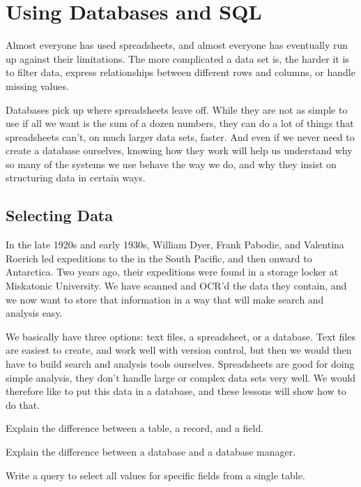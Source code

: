\documentclass{book}
\begin{document}
\chapter{Using Databases and SQL}\label{s:sql}

Almost everyone has used spreadsheets, and almost everyone has
eventually run up against their limitations. The more complicated a data
set is, the harder it is to filter data, express relationships between
different rows and columns, or handle missing values.

Databases pick up where spreadsheets leave off. While they are not as
simple to use if all we want is the sum of a dozen numbers, they can do
a lot of things that spreadsheets can't, on much larger data sets,
faster. And even if we never need to create a database ourselves,
knowing how they work will help us understand why so many of the systems
we use behave the way we do, and why they insist on structuring data in
certain ways.

\section{Selecting Data}

In the late 1920s and early 1930s, William Dyer, Frank Pabodie, and
Valentina Roerich led expeditions to the
 in the South Pacific, and then onward to Antarctica.
Two years ago, their expeditions were found in a storage locker at
Miskatonic University. We have scanned and OCR'd the data they contain,
and we now want to store that information in a way that will make search
and analysis easy.

We basically have three options: text files, a spreadsheet, or a
database. Text files are easiest to create, and work well with version
control, but then we would then have to build search and analysis tools
ourselves. Spreadsheets are good for doing simple analysis, they don't
handle large or complex data sets very well. We would therefore like to
put this data in a database, and these lessons will show how to do that.

\begin{objectives}
\begin{swcitemize}
\item
  Explain the difference between a table, a record, and a field.
\item
  Explain the difference between a database and a database manager.
\item
  Write a query to select all values for specific fields from a single
  table.
\end{swcitemize}
\end{objectives}
\end{document}

